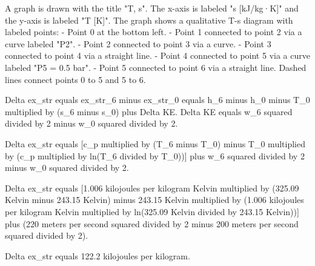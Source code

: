 A graph is drawn with the title "T, s". The x-axis is labeled "s [kJ/kg·K]" and the y-axis is labeled "T [K]".  
The graph shows a qualitative T-s diagram with labeled points:  
- Point 0 at the bottom left.  
- Point 1 connected to point 2 via a curve labeled "P2".  
- Point 2 connected to point 3 via a curve.  
- Point 3 connected to point 4 via a straight line.  
- Point 4 connected to point 5 via a curve labeled "P5 = 0.5 bar".  
- Point 5 connected to point 6 via a straight line.  
Dashed lines connect points 0 to 5 and 5 to 6.

Delta ex_str equals ex_str_6 minus ex_str_0 equals h_6 minus h_0 minus T_0 multiplied by (s_6 minus s_0) plus Delta KE.  
Delta KE equals w_6 squared divided by 2 minus w_0 squared divided by 2.  

Delta ex_str equals [c_p multiplied by (T_6 minus T_0) minus T_0 multiplied by (c_p multiplied by ln(T_6 divided by T_0))] plus w_6 squared divided by 2 minus w_0 squared divided by 2.  

Delta ex_str equals [1.006 kilojoules per kilogram Kelvin multiplied by (325.09 Kelvin minus 243.15 Kelvin) minus 243.15 Kelvin multiplied by (1.006 kilojoules per kilogram Kelvin multiplied by ln(325.09 Kelvin divided by 243.15 Kelvin))] plus (220 meters per second squared divided by 2 minus 200 meters per second squared divided by 2).  

Delta ex_str equals 122.2 kilojoules per kilogram.
